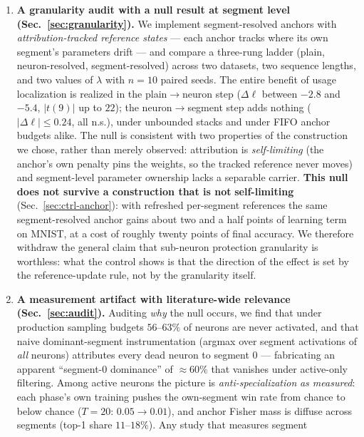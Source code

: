\documentclass[review,12pt,number]{elsarticle}
\begin{document}
\begin{enumerate}
\item \textbf{A granularity audit with a null result at segment level
      (Sec.~\ref{sec:granularity}).} We implement segment-resolved anchors
      with \emph{attribution-tracked reference states} --- each anchor tracks
      where its own segment's parameters drift --- and compare a three-rung
      ladder (plain, neuron-resolved, segment-resolved) across two datasets,
      two sequence lengths, and two values of $\lambda$ with $n{=}10$ paired seeds. The
      entire benefit of usage localization is realized in the
      plain$\to$neuron step ($\Delta\ell$ between $-2.8$ and $-5.4$,
      $|t(9)|$ up to $22$); the neuron$\to$segment step adds nothing
      ($|\Delta\ell|\le 0.24$, all n.s.), under unbounded stacks and under
      FIFO anchor budgets alike. The null is consistent with two properties of the
      construction we chose, rather than merely observed: attribution is
      \emph{self-limiting} (the anchor's own
      penalty pins the weights, so the tracked reference never moves) and
      segment-level parameter ownership lacks a separable carrier.
      \textbf{This null does not survive a construction that is not}
      \textbf{self-limiting} (Sec.~\ref{sec:ctrl-anchor}): with refreshed
      per-segment references the same segment-resolved anchor gains
      about two and a half points of learning term on MNIST, at a cost of roughly
      twenty points of final accuracy. We therefore withdraw the general
      claim that sub-neuron protection granularity is worthless: what the
      control shows is that the direction of the effect is set by the
      reference-update rule, not by the granularity itself.
\item \textbf{A measurement artifact with literature-wide relevance
      (Sec.~\ref{sec:audit}).} Auditing \emph{why} the null occurs, we find
      that under production sampling budgets $56$--$63\%$ of neurons are
      never activated, and that naive dominant-segment instrumentation
      (argmax over segment activations of \emph{all} neurons) attributes
      every dead neuron to segment 0 --- fabricating an apparent
      ``segment-0 dominance'' of $\approx 60\%$ that vanishes under
      active-only filtering. Among active neurons the picture is
      \emph{anti-specialization} \emph{as measured}: each phase's own training pushes the
      own-segment win rate from chance to below chance
      ($T{=}20$: $0.05 \to 0.01$), and anchor Fisher mass is diffuse across
      segments (top-1 share $11$--$18\%$). Any study that measures segment

\end{enumerate}
\end{document}
